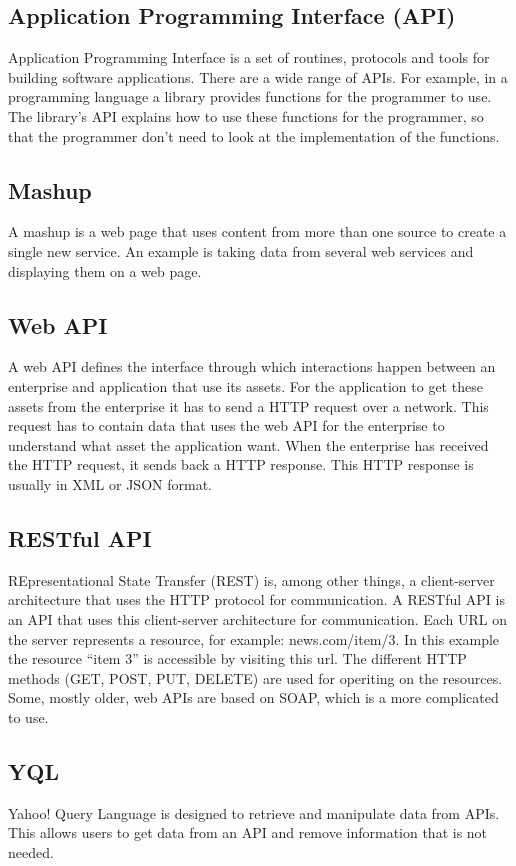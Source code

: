 \documentclass[10pt,a4paper]{article}
\begin{document}
\subsection{Application Programming Interface (API)}
Application Programming Interface is a set of routines, protocols and tools for building software applications. There are a wide range of APIs. For example, in a programming language a library provides functions for the programmer to use. The library's API explains how to use these functions for the programmer, so that the programmer don't need to look at the implementation of the functions. 
\subsection{Mashup}
A mashup is a web page that uses content from more than one source to create a single new service. An  example is taking data from several web services and displaying them on a web page.
\subsection{Web API}
A web API defines the interface through which interactions happen between an enterprise and application that use its assets. For the application to get these assets from the enterprise it has to send a HTTP request over a network. This request has to contain data that uses the web API for the enterprise to understand what asset the application want. When the enterprise has received the HTTP request, it sends back a HTTP response. This HTTP response is usually in XML or JSON format.

\subsection{RESTful API}
\label{sec:restful-api}
REpresentational State Transfer (REST) is, among other things, a client-server architecture that uses the HTTP protocol for communication. A RESTful API is an API that uses this client-server architecture for communication. Each URL on the server represents a resource, for example: news.com/item/3. In this example the resource ``item 3'' is accessible by visiting this url. The different HTTP methods (GET, POST, PUT, DELETE) are used for operiting on the resources. Some, mostly older, web APIs are based on SOAP, which is a more complicated to use.

\subsection{YQL}
Yahoo! Query Language is designed to retrieve and manipulate data from APIs. This allows users to get data from an API and remove information that is not needed.
\end{document}
